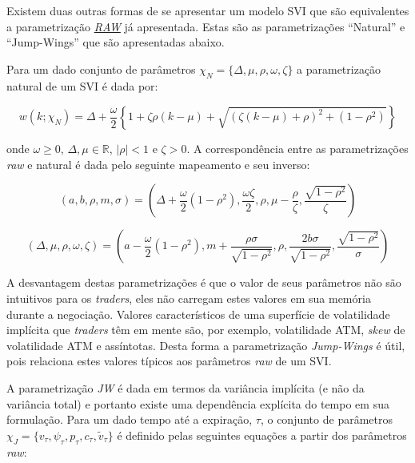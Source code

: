 \documentclass[]{book}
\theoremstyle{definition}
\theoremstyle{definition}
\theoremstyle{definition}
\theoremstyle{remark}
\begin{document}
Existem duas outras formas de se apresentar um modelo SVI que são
equivalentes a parametrização
\protect\hyperlink{superficies}{\emph{RAW}} já apresentada. Estas são as
parametrizações ``Natural'' e ``Jump-Wings'' que são apresentadas
abaixo.

Para um dado conjunto de parâmetros
\(\chi_N=\{\Delta, \mu, \rho, \omega, \zeta\}\) a parametrização natural
de um SVI é dada por:

\begin{equation}
w(k; \chi_N)=\Delta+\frac{\omega}{2}\left\lbrace 1+\zeta\rho(k-\mu)+\sqrt{(\zeta(k-\mu)+\rho)^2+(1-\rho^2)} \right\rbrace
\label{eq:svi-natural}
\end{equation}

onde \(\omega\geq 0\), \(\Delta, \mu \in \mathbb R\), \(|\rho|<1\) e
\(\zeta>0\). A correspondência entre as parametrizações \emph{raw} e
natural é dada pelo seguinte mapeamento e seu inverso:

\begin{equation}
(a, b, \rho, m, \sigma)=\left(\Delta+\frac{\omega}{2}(1-\rho^2), \frac{\omega\zeta}{2}, \rho, \mu-\frac{\rho}{\zeta}, \frac{\sqrt{1-\rho^2}}{\zeta}\right)
\label{eq:natural-to-raw}
\end{equation}

\begin{equation}
(\Delta, \mu, \rho, \omega, \zeta)=\left(a-\frac{\omega}{2}(1-\rho^2), m+\frac{\rho\sigma}{\sqrt{1-\rho^2}}, \rho, \frac{2b\sigma}{\sqrt{1-\rho^2}}, \frac{\sqrt{1-\rho^2}}{\sigma}\right)
\label{eq:raw-to-natural}
\end{equation}

A desvantagem destas parametrizações é que o valor de seus parâmetros
não são intuitivos para os \emph{traders}, eles não carregam estes
valores em sua memória durante a negociação. Valores característicos de
uma superfície de volatilidade implícita que \emph{traders} têm em mente
são, por exemplo, volatilidade ATM, \emph{skew} de volatilidade ATM e
assíntotas. Desta forma a parametrização \emph{Jump-Wings} é útil, pois
relaciona estes valores típicos aos parâmetros \emph{raw} de um SVI.

A parametrização \emph{JW} é dada em termos da variância implícita (e
não da variância total) e portanto existe uma dependência explícita do
tempo em sua formulação. Para um dado tempo até a expiração, \(\tau\), o
conjunto de parâmetros
\(\chi_{J}=\{v_\tau, \psi_\tau, p_\tau, c_\tau, \tilde v_\tau\}\) é
definido pelas seguintes equações a partir dos parâmetros \emph{raw}:
\end{document}
